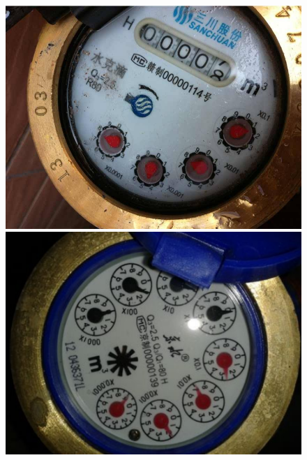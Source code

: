 \documentclass[a4paper]{ctexart}
\begin{document}
\begin{figure}[htbp]
\begin{minipage}[t]{0.25\textwidth}
		\caption{}\label{fig:2}
	\end{minipage}\\
	\begin{minipage}[t]{0.25\textwidth}
		\centering
		\includegraphics[width=\textwidth]{figure/img3.jpg}
		\caption{}\label{fig:3}
	\end{minipage}
	\begin{minipage}[t]{0.25\textwidth}
		\centering
		\includegraphics[width=\textwidth]{figure/img4.pdf}
		\caption{}\label{fig:4}
	\end{minipage}
	\begin{minipage}[t]{0.25\textwidth}
		\centering

\end{minipage}
\end{figure}
\end{document}
